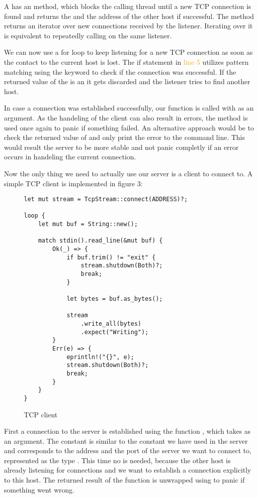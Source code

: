 A  has an  method, which blocks the calling thread until a new TCP connection is found
and returns the  and the address of the other host if successful. The method  returns an
iterator over new connections received by the listener. Iterating over it is equivalent to repeatedly calling
 on the same listener.

We can now use a for loop to keep listening for a new TCP connection as soon as the contact to the current host is
lost. The if statement in \textcolor{orange}{line 5} utilizes pattern matching using the keyword  to check
if the connection was successful. If the returned value of the  is an  it gets discarded
and the listener tries to find another host.

In case a connection was established successfully, our function  is called with  as an
argument. As the handeling of the client can also result in errors, the  method is used once again to
panic if something failed. An alternative approach would be to check the returned value of  and
only print the error to the command line. This would result the server to be more stable and not panic completly if an
error occurs in handeling the current connection.

Now the only thing we need to actually use our server is a client to connect to. A simple TCP client is implemented in
figure 3:

\begin{figure}[h]
    \begin{verbatim}
let mut stream = TcpStream::connect(ADDRESS)?;

loop {
    let mut buf = String::new();

    match stdin().read_line(&mut buf) {
        Ok(_) => {
            if buf.trim() != "exit" {
                stream.shutdown(Both)?;
                break;
            }

            let bytes = buf.as_bytes();

            stream
                .write_all(bytes)
                .expect("Writing");
        }
        Err(e) => {
            eprintln!("{}", e);
            stream.shutdown(Both)?;
            break;
        }
    }
}
    \end{verbatim}
    \caption{TCP client}
\end{figure}

First a connection to the server is established using the function , which takes
 as an argument. The constant  is similar to the constant we have used in the server and
corresponds to the address and the port of the server we want to connect to, represented as the type . This
time no  is needed, because the other host is already listening for connections and we want to
establish a connection explicitly to this host. The returned result of the function is unwrapped using  to
panic if something went wrong.

